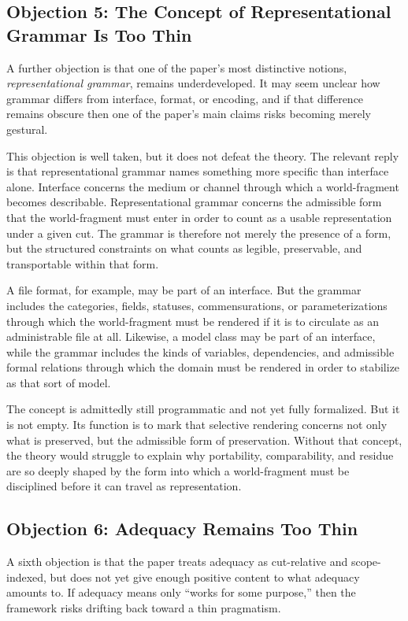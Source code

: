 \documentclass[11pt]{article}
\renewcommand{\emph}[1]{\textit{#1}}
\begin{document}
\subsection{Objection 5: The Concept of Representational Grammar Is Too Thin}

A further objection is that one of the paper's most distinctive notions, \emph{representational grammar}, remains underdeveloped. It may seem unclear how grammar differs from interface, format, or encoding, and if that difference remains obscure then one of the paper's main claims risks becoming merely gestural.

This objection is well taken, but it does not defeat the theory. The relevant reply is that representational grammar names something more specific than interface alone. Interface concerns the medium or channel through which a world-fragment becomes describable. Representational grammar concerns the admissible form that the world-fragment must enter in order to count as a usable representation under a given cut. The grammar is therefore not merely the presence of a form, but the structured constraints on what counts as legible, preservable, and transportable within that form.

A file format, for example, may be part of an interface. But the grammar includes the categories, fields, statuses, commensurations, or parameterizations through which the world-fragment must be rendered if it is to circulate as an administrable file at all. Likewise, a model class may be part of an interface, while the grammar includes the kinds of variables, dependencies, and admissible formal relations through which the domain must be rendered in order to stabilize as that sort of model.

The concept is admittedly still programmatic and not yet fully formalized. But it is not empty. Its function is to mark that selective rendering concerns not only what is preserved, but the admissible form of preservation. Without that concept, the theory would struggle to explain why portability, comparability, and residue are so deeply shaped by the form into which a world-fragment must be disciplined before it can travel as representation.

\subsection{Objection 6: Adequacy Remains Too Thin}

A sixth objection is that the paper treats adequacy as cut-relative and scope-indexed, but does not yet give enough positive content to what adequacy amounts to. If adequacy means only ``works for some purpose,'' then the framework risks drifting back toward a thin pragmatism.
\end{document}
